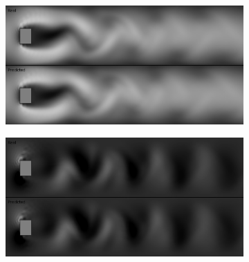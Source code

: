 \documentclass{llncs}
\begin{document}
\begin{figure}
  \begin{subfigure}{.5\textwidth}
    \centering
    \includegraphics[width=1\linewidth]{imgs/x_recursive_0_fluid_25}
  \end{subfigure}
  \begin{subfigure}{.5\textwidth}
    \centering
    \includegraphics[width=1\linewidth]{imgs/y_recursive_0_fluid_25}
  \end{subfigure}


\end{figure}
\end{document}

